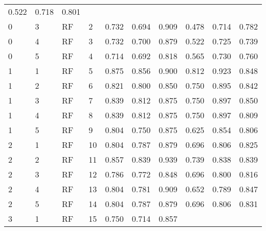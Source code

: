 \begin{table}[ht]
\begin{adjustbox}{width=\textwidth}
\begin{tabular}{llllrrrrrr}
 0.522 & 0.718 & 0.801 \\
   0 &           3 &    RF &           2 & 0.732 &  0.694 &        0.909 &      
 
 0.478 & 0.714 & 0.782 \\
   0 &           4 &    RF &           3 & 0.732 &  0.700 &        0.879 &      
 
 0.522 & 0.725 & 0.739 \\
   0 &           5 &    RF &           4 & 0.714 &  0.692 &        0.818 &      
 
 0.565 & 0.730 & 0.760 \\
   1 &           1 &    RF &           5 & 0.875 &  0.856 &        0.900 &      
 
 0.812 & 0.923 & 0.848 \\
   1 &           2 &    RF &           6 & 0.821 &  0.800 &        0.850 &      
 
 0.750 & 0.895 & 0.842 \\
   1 &           3 &    RF &           7 & 0.839 &  0.812 &        0.875 &      
 
 0.750 & 0.897 & 0.850 \\
   1 &           4 &    RF &           8 & 0.839 &  0.812 &        0.875 &      
 
 0.750 & 0.897 & 0.809 \\
   1 &           5 &    RF &           9 & 0.804 &  0.750 &        0.875 &      
 
 0.625 & 0.854 & 0.806 \\
   2 &           1 &    RF &          10 & 0.804 &  0.787 &        0.879 &      
 
 0.696 & 0.806 & 0.825 \\
   2 &           2 &    RF &          11 & 0.857 &  0.839 &        0.939 &      
 
 0.739 & 0.838 & 0.839 \\
   2 &           3 &    RF &          12 & 0.786 &  0.772 &        0.848 &      
 
 0.696 & 0.800 & 0.816 \\
   2 &           4 &    RF &          13 & 0.804 &  0.781 &        0.909 &      
 
 0.652 & 0.789 & 0.847 \\
   2 &           5 &    RF &          14 & 0.804 &  0.787 &        0.879 &      
 
 0.696 & 0.806 & 0.831 \\
   3 &           1 &    RF &          15 & 0.750 &  0.714 &        0.857 &      
 

\end{tabular}
\end{adjustbox}
\end{table}
